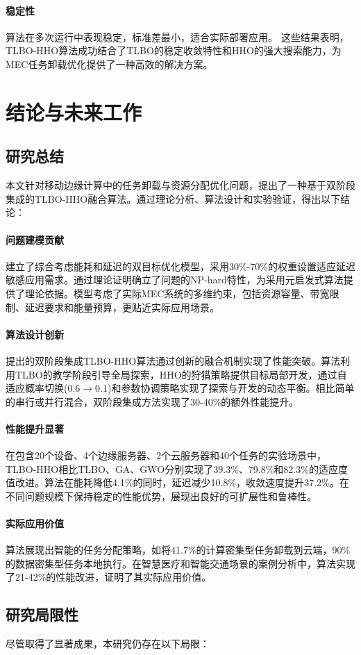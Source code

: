 \documentclass[conference]{IEEEtran}
\begin{document}
\paragraph{稳定性}算法在多次运行中表现稳定，标准差最小，适合实际部署应用。
这些结果表明，TLBO-HHO算法成功结合了TLBO的稳定收敛特性和HHO的强大搜索能力，为MEC任务卸载优化提供了一种高效的解决方案。
\section{结论与未来工作}
\subsection{研究总结}
本文针对移动边缘计算中的任务卸载与资源分配优化问题，提出了一种基于双阶段集成的TLBO-HHO融合算法。通过理论分析、算法设计和实验验证，得出以下结论：
\paragraph{问题建模贡献}建立了综合考虑能耗和延迟的双目标优化模型，采用30\%-70\%的权重设置适应延迟敏感应用需求。通过理论证明确立了问题的NP-hard特性，为采用元启发式算法提供了理论依据。模型考虑了实际MEC系统的多维约束，包括资源容量、带宽限制、延迟要求和能量预算，更贴近实际应用场景。
\paragraph{算法设计创新}提出的双阶段集成TLBO-HHO算法通过创新的融合机制实现了性能突破。算法利用TLBO的教学阶段引导全局探索，HHO的狩猎策略提供目标局部开发，通过自适应概率切换(0.6$\rightarrow$0.1)和参数协调策略实现了探索与开发的动态平衡。相比简单的串行或并行混合，双阶段集成方法实现了30-40\%的额外性能提升。
\paragraph{性能提升显著}在包含20个设备、4个边缘服务器、2个云服务器和40个任务的实验场景中，TLBO-HHO相比TLBO、GA、GWO分别实现了39.3\%、79.8\%和82.3\%的适应度值改进。算法在能耗降低4.1\%的同时，延迟减少10.8\%，收敛速度提升37.2\%。在不同问题规模下保持稳定的性能优势，展现出良好的可扩展性和鲁棒性。
\paragraph{实际应用价值}算法展现出智能的任务分配策略，如将41.7\%的计算密集型任务卸载到云端，90\%的数据密集型任务本地执行。在智慧医疗和智能交通场景的案例分析中，算法实现了21-42\%的性能改进，证明了其实际应用价值。
\subsection{研究局限性}
尽管取得了显著成果，本研究仍存在以下局限：
\end{document}
